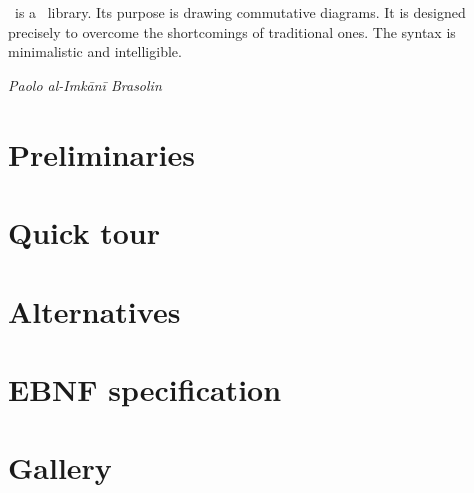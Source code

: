 




\thispagestyle{empty}
\noindent
{}\\[.6em]
\\[1.6em]
\par
\vfill\hfill
{}


\newpage
\noindent\koDi\ is a \TikZ\ library. Its purpose
is drawing commutative diagrams.
It is designed precisely to overcome
the shortcomings of traditional ones.
The syntax is minimalistic and intelligible.\par
\hfill{\itshape Paolo al-Imkānī Brasolin}


\newpage
\section{Preliminaries}




\newpage
\section{Quick tour}




\newpage
\section{Alternatives}




\newpage
\section{EBNF specification}




\newpage
\section{Gallery}



